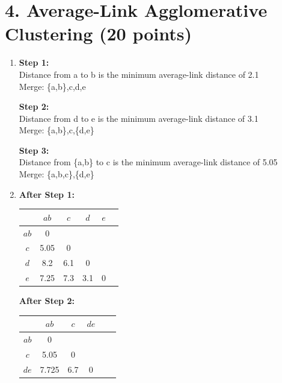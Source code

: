\documentclass[12pt]{article}
\begin{document}
\newpage
\section*{4. Average-Link Agglomerative Clustering (20 points)}
\begin{enumerate}[label=(\alph*)]

    \item

    \textbf{Step 1:} \\
    Distance from a to b is the minimum average-link distance of 2.1 \\
    Merge: \{a,b\},c,d,e

    \textbf{Step 2:} \\
    Distance from d to e is the minimum average-link distance of 3.1 \\
    Merge: \{a,b\},c,\{d,e\}

    \textbf{Step 3:} \\
    Distance from \{a,b\} to c is the minimum average-link distance of 5.05 \\
    Merge: \{a,b,c\},\{d,e\}

    \vspace{2em}

    \item 

    \textbf{After Step 1:}
    \begin{center}
    \begin{tabular}{c|ccccc}
         & $ab$  & $c$  & $d$ & $e$   \\ \hline
    $ab$ & 0     &       &      &     \\
    $c$  & 5.05  & 0     &      &     \\
    $d$  & 8.2   & 6.1   & 0    &     \\
    $e$  & 7.25  & 7.3   & 3.1  & 0   \\
    \end{tabular}
    \end{center}


    \textbf{After Step 2:}
    \begin{center}
    \begin{tabular}{c|ccccc}
         & $ab$  & $c$  & $de$  \\ \hline
    $ab$ & 0     &       &      \\
    $c$  & 5.05  & 0     &      \\
    $de$ & 7.725 & 6.7   & 0    \\


\end{tabular}
\end{center}
\end{enumerate}
\end{document}
